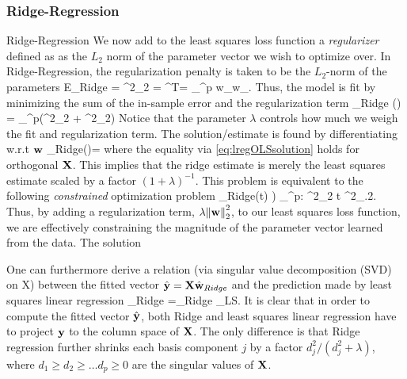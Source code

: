 \subsubsection{Ridge-Regression}
\begin{mybox}{Ridge-Regression}
	We now add to the least squares loss function a \emph{regularizer} defined as as the $L_2$ norm of the parameter vector we wish to optimize over. In Ridge-Regression, the regularization penalty is taken to be the $L_2$-norm of the parameters 
	\be 
	E_{Ridge} = \lambda \norm{\mw}^2_2 = \lambda \mw^T\mw = \lambda \sum_{}^p w_\gamma w_\gamma.
	\ee 
	Thus, the model is fit by minimizing the sum of the in-sample error and the regularization term
	\be 
	\label{eq:lregRidge}
	\hat{\mw}_{Ridge} (\lambda) = \arg \min_{\mw \in \mR^p}\left(\norm{\mX \mw - \my}^2_2 + \lambda \norm{\mw}^2_2\right)
	\ee 
	Notice that the parameter $\lambda$ controls how much we weigh the fit and regularization term.
	The solution/estimate is found by differentiating w.r.t $\mathbf{w}$
	\be 
	\label{eq:lregRidgeSol}
	\hat{\mw}_{Ridge}(\lambda)= 
	\ee 
	where the  equality via \ref{eq:lregOLSsolution} holds for orthogonal $\mathbf{X}$. This implies that the ridge estimate is merely the least squares estimate scaled by a factor $(1+\lambda)^{-1}$.
	This problem is equivalent to the following \emph{constrained} optimization problem
	\be 
	\hat{\mw}_{Ridge}(t) ) \arg \min_{\mw \in \mR^p: \norm{\mw}^2_2 \leq t} \norm{\mX \mw -\my}^2_.2.
	\ee 
	Thus, by adding a regularization term, $\lambda \norm{\mathbf{w}}^2_2$, to our least squares loss function, we are effectively constraining the magnitude of the parameter vector learned from the data. The solution
\end{mybox}
One can furthermore derive a relation (via singular value decomposition (SVD) on X) between the fitted vector $\hat{\mathbf{y}}=\mathbf{X}\hat{\mathbf{w}}_{Ridge}$ and the prediction made by least squares linear regression
\be 
{}_{Ridge} =\mX \hat{\mw}_{Ridge} \leq \mX \hat{\my} \equiv \hat{\my}_{LS}.
\ee 
It is clear that in order to compute the fitted vector $\hat{\mathbf{y}}$, both Ridge and least squares linear regression have to project $\mathbf{y}$ to the column space of $\mathbf{X}$. The only difference is that Ridge regression further shrinks each basis component $j$ by a factor $d^2_j/(d^2_j+\lambda)$, where $d_1\geq d_2\geq \dots d_p \geq 0$ are the singular values of $\mathbf{X}$.


